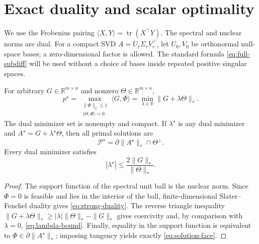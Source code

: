 \section{Exact duality and scalar optimality}
\label{sec:duality}

We use the Frobenius pairing
\(\langle X,Y\rangle=\operatorname{tr}(X^\top Y)\).  The spectral and
nuclear norms are dual.  For a compact SVD \(A=U_r\Sigma_rV_r^\top\), let
\(U_0,V_0\) be orthonormal null-space bases; a zero-dimensional factor is
allowed.  The standard formula \eqref{eq:full-subdiff} will be used without a
choice of bases inside repeated positive singular spaces.

\begin{theorem}
\label{thm:T1}
For arbitrary \(G\in\mathbb R^{m\times n}\) and nonzero
\(\Theta\in\mathbb R^{m\times n}\),
\begin{equation}
 p^\star
 =\max_{\substack{\|\Phi\|_2\le1\\
                   \langle\Theta,\Phi\rangle=0}}
   \langle G,\Phi\rangle
 =\min_{\lambda\in\mathbb R}\|G+\lambda\Theta\|_*.
 \label{eq:strong-duality}
\end{equation}
The dual minimizer set is nonempty and compact.  If \(\lambda^\star\) is any
dual minimizer and \(A^\star=G+\lambda^\star\Theta\), then all primal
solutions are
\begin{equation}
 \mathcal P^\star
 =\partial\|A^\star\|_*\cap\Theta^\perp.
 \label{eq:solution-face}
\end{equation}
Every dual minimizer satisfies
\begin{equation}
 |\lambda^\star|
 \le \frac{2\|G\|_*}{\|\Theta\|_*}.
 \label{eq:lambda-bound}
\end{equation}
\end{theorem}

\begin{proof}
The support function of the spectral unit ball is the nuclear norm.  Since
\(\Phi=0\) is feasible and lies in the interior of the ball,
finite-dimensional Slater--Fenchel duality gives
\eqref{eq:strong-duality}.  The reverse triangle inequality
\(\|G+\lambda\Theta\|_*\ge
|\lambda|\|\Theta\|_*-\|G\|_*\) gives coercivity and, by comparison with
\(\lambda=0\), \eqref{eq:lambda-bound}.  Finally, equality in the support
function is equivalent to
\(\Phi\in\partial\|A^\star\|_*\); imposing tangency yields exactly
\eqref{eq:solution-face}.
\end{proof}

